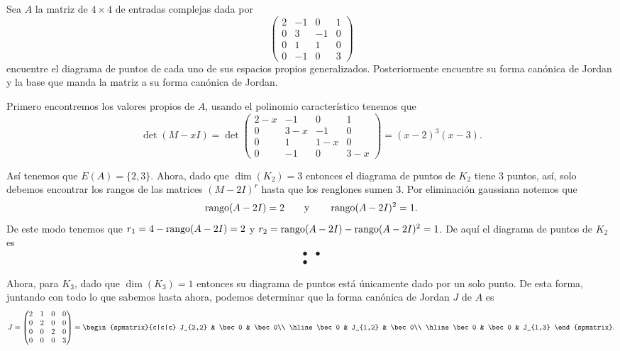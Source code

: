 \begin{example}
  Sea $A$ la matriz de $4\times 4$ de entradas complejas dada por 
    \[
      \begin{pmatrix}
      2 & -1 & 0 & 1 \\
      0 & 3 & -1 & 0 \\
      0 & 1 & 1 & 0 \\
      0 & -1 & 0 & 3 
    \end{pmatrix}
    \]
  encuentre el diagrama de puntos de cada uno de sus espacios propios generalizados. Posteriormente encuentre su forma canónica de Jordan y la base que manda la matriz a su forma canónica de Jordan.

  \examplesolution

  Primero encontremos los valores propios de $A$, usando el polinomio característico tenemos que
    \[
      \det(M-xI) = \det\begin{pmatrix}
        2-x & -1 & 0 & 1 \\
        0 & 3-x & -1 & 0 \\
        0 & 1 & 1-x & 0 \\
        0 & -1 & 0 & 3-x
      \end{pmatrix}
      = (x-2)^3(x-3).
    \]

  Así tenemos que $E(A) = \{2,3\}$. Ahora, dado que $\dim(K_2) = 3$ entonces el diagrama de puntos de $K_2$ tiene 3 puntos, así, solo debemos encontrar los rangos de las matrices $(M-2I)^r$ hasta que los renglones sumen 3. Por eliminación gaussiana notemos que
  \[
    \operatorname{rango}(A-2I) = 2 
      \qquad\text{y}\qquad
    \operatorname{rango}(A-2I)^2 = 1.
  \]
  De este modo tenemos que $r_1  = 4 - \operatorname{rango}(A-2I) = 2$ y $r_2 = \operatorname{rango}(A-2I) - \operatorname{rango}(A-2I)^2 = 1$. De aquí el diagrama de puntos de $K_2$ es 
  \[
    \begin{array}{cc}
      \bullet & \bullet\\
      \bullet
    \end{array}
  \]

  Ahora, para $K_3$, dado que $\dim(K_3) = 1$ entonces su diagrama de puntos está únicamente dado por un solo punto. De esta forma, juntando con todo lo que sabemos hasta ahora, podemos determinar que la forma canónica de Jordan $J$ de $A$ es
  \[
    J = \begin{pmatrix} 2 & 1 & 0 & 0 \\ 0 & 2 & 0 & 0 \\ 0 & 0 & 2 & 0 \\ 0 & 0 & 0 &3 \end{pmatrix}
    = \begin{spmatrix}{c|c|c}
      J_{2,2} & \bec 0 & \bec 0\\ \hline
      \bec 0 & J_{1,2} & \bec 0\\ \hline
      \bec 0 & \bec 0 & J_{1,3}
    \end{spmatrix}.
  \]


\end{example}
